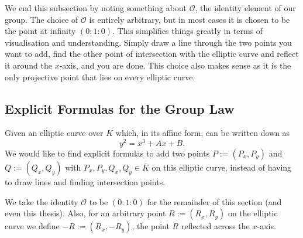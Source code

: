 \documentclass[openany, a4paper, 10pt]{book}
\theoremstyle{plain}
\theoremstyle{plain}
\theoremstyle{plain}
\theoremstyle{definition}
\theoremstyle{plain}
\theoremstyle{definition}
\theoremstyle{remark}
\begin{document}
We end this subsection by noting something about $\mathcal O$, the identity element of our group.
The choice of $\mathcal O$ is entirely arbitrary, but
in most cases it is chosen to be the point at infinity $(0:1:0)$.
This simplifies things greatly in terms of visualisation and understanding.
Simply draw a line through the two points you want to add,
find the other point of intersection with the elliptic curve and reflect it around
the $x$-axis, and you are done.
This choice also makes sense as it is the only projective point that lies on every elliptic curve.


\subsection{Explicit Formulas for the Group Law}\label{subsec:addition}
Given an elliptic curve over $K$ which, in its affine form, can be written down as
\begin{equation}\label{eq:EC_C}
    y^2 = x^3 + Ax + B.
\end{equation}
We would like to find explicit formulas to add two points $P:=(P_x, P_y)$ and $Q:=(Q_x, Q_y)$ with $P_x,P_y,Q_x,Q_y \in \overline K$ on this elliptic curve,
instead of having to draw lines and finding intersection points.

We take the identity $\mathcal O$ to be $(0:1:0)$ for the remainder of this section (and even this thesis).
Also, for an arbitrary point $R:= (R_x, R_y)$ on the elliptic curve we define $-R:= (R_x, -R_y)$, the point $R$ reflected across the $x$-axis.
\end{document}
